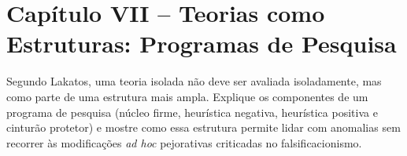 \documentclass[10pt]{extarticle}
\begin{document}
\section*{Capítulo VII -- Teorias como Estruturas: Programas de Pesquisa}
\begin{questoes}

\item Segundo Lakatos, uma teoria isolada não deve ser avaliada isoladamente, mas como parte de uma estrutura mais ampla. Explique os componentes de um programa de pesquisa (núcleo firme, heurística negativa, heurística positiva e cinturão protetor) e mostre como essa estrutura permite lidar com anomalias sem recorrer às modificações \emph{ad hoc} pejorativas criticadas no falsificacionismo.


\end{questoes}
\end{document}
